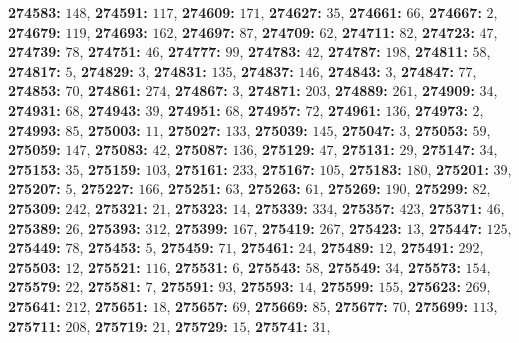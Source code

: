 \textsf{\bfseries 274583:} $148$, \textsf{\bfseries 274591:} $117$, \textsf{\bfseries 274609:} $171$, \textsf{\bfseries 274627:} $35$, \textsf{\bfseries 274661:} $66$, \textsf{\bfseries 274667:} $2$, \textsf{\bfseries 274679:} $119$, \textsf{\bfseries 274693:} $162$, \textsf{\bfseries 274697:} $87$, \textsf{\bfseries 274709:} $62$, \textsf{\bfseries 274711:} $82$, \textsf{\bfseries 274723:} $47$, \textsf{\bfseries 274739:} $78$, \textsf{\bfseries 274751:} $46$, \textsf{\bfseries 274777:} $99$, \textsf{\bfseries 274783:} $42$, \textsf{\bfseries 274787:} $198$, \textsf{\bfseries 274811:} $58$, \textsf{\bfseries 274817:} $5$, \textsf{\bfseries 274829:} $3$, \textsf{\bfseries 274831:} $135$, \textsf{\bfseries 274837:} $146$, \textsf{\bfseries 274843:} $3$, \textsf{\bfseries 274847:} $77$, \textsf{\bfseries 274853:} $70$, \textsf{\bfseries 274861:} $274$, \textsf{\bfseries 274867:} $3$, \textsf{\bfseries 274871:} $203$, \textsf{\bfseries 274889:} $261$, \textsf{\bfseries 274909:} $34$, \textsf{\bfseries 274931:} $68$, \textsf{\bfseries 274943:} $39$, \textsf{\bfseries 274951:} $68$, \textsf{\bfseries 274957:} $72$, \textsf{\bfseries 274961:} $136$, \textsf{\bfseries 274973:} $2$, \textsf{\bfseries 274993:} $85$, \textsf{\bfseries 275003:} $11$, \textsf{\bfseries 275027:} $133$, \textsf{\bfseries 275039:} $145$, \textsf{\bfseries 275047:} $3$, \textsf{\bfseries 275053:} $59$, \textsf{\bfseries 275059:} $147$, \textsf{\bfseries 275083:} $42$, \textsf{\bfseries 275087:} $136$, \textsf{\bfseries 275129:} $47$, \textsf{\bfseries 275131:} $29$, \textsf{\bfseries 275147:} $34$, \textsf{\bfseries 275153:} $35$, \textsf{\bfseries 275159:} $103$, \textsf{\bfseries 275161:} $233$, \textsf{\bfseries 275167:} $105$, \textsf{\bfseries 275183:} $180$, \textsf{\bfseries 275201:} $39$, \textsf{\bfseries 275207:} $5$, \textsf{\bfseries 275227:} $166$, \textsf{\bfseries 275251:} $63$, \textsf{\bfseries 275263:} $61$, \textsf{\bfseries 275269:} $190$, \textsf{\bfseries 275299:} $82$, \textsf{\bfseries 275309:} $242$, \textsf{\bfseries 275321:} $21$, \textsf{\bfseries 275323:} $14$, \textsf{\bfseries 275339:} $334$, \textsf{\bfseries 275357:} $423$, \textsf{\bfseries 275371:} $46$, \textsf{\bfseries 275389:} $26$, \textsf{\bfseries 275393:} $312$, \textsf{\bfseries 275399:} $167$, \textsf{\bfseries 275419:} $267$, \textsf{\bfseries 275423:} $13$, \textsf{\bfseries 275447:} $125$, \textsf{\bfseries 275449:} $78$, \textsf{\bfseries 275453:} $5$, \textsf{\bfseries 275459:} $71$, \textsf{\bfseries 275461:} $24$, \textsf{\bfseries 275489:} $12$, \textsf{\bfseries 275491:} $292$, \textsf{\bfseries 275503:} $12$, \textsf{\bfseries 275521:} $116$, \textsf{\bfseries 275531:} $6$, \textsf{\bfseries 275543:} $58$, \textsf{\bfseries 275549:} $34$, \textsf{\bfseries 275573:} $154$, \textsf{\bfseries 275579:} $22$, \textsf{\bfseries 275581:} $7$, \textsf{\bfseries 275591:} $93$, \textsf{\bfseries 275593:} $14$, \textsf{\bfseries 275599:} $155$, \textsf{\bfseries 275623:} $269$, \textsf{\bfseries 275641:} $212$, \textsf{\bfseries 275651:} $18$, \textsf{\bfseries 275657:} $69$, \textsf{\bfseries 275669:} $85$, \textsf{\bfseries 275677:} $70$, \textsf{\bfseries 275699:} $113$, \textsf{\bfseries 275711:} $208$, \textsf{\bfseries 275719:} $21$, \textsf{\bfseries 275729:} $15$, \textsf{\bfseries 275741:} $31$, 
